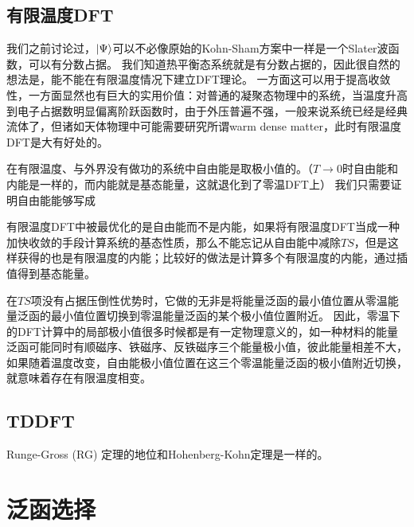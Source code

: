 \subsection{有限温度DFT}

我们之前讨论过，$\ket{\Psi}$可以不必像原始的Kohn-Sham方案中一样是一个Slater波函数，可以有分数占据。
我们知道热平衡态系统就是有分数占据的，因此很自然的想法是，能不能在有限温度情况下建立DFT理论。
一方面这可以用于提高收敛性，一方面显然也有巨大的实用价值：对普通的凝聚态物理中的系统，当温度升高到电子占据数明显偏离阶跃函数时，由于外压普遍不强，一般来说系统已经是经典流体了，但诸如天体物理中可能需要研究所谓warm dense matter，此时有限温度DFT是大有好处的。

在有限温度、与外界没有做功的系统中自由能是取极小值的。（$T \to 0$时自由能和内能是一样的，而内能就是基态能量，这就退化到了零温DFT上）
我们只需要证明自由能能够写成 \cite{mermin1965}

有限温度DFT中被最优化的是自由能而不是内能，如果将有限温度DFT当成一种加快收敛的手段计算系统的基态性质，那么不能忘记从自由能中减除$TS$，但是这样获得的也是有限温度的内能；比较好的做法是计算多个有限温度的内能，通过插值得到基态能量。

在$TS$项没有占据压倒性优势时，它做的无非是将能量泛函的最小值位置从零温能量泛函的最小值位置切换到零温能量泛函的某个极小值位置附近。
因此，零温下的DFT计算中的局部极小值很多时候都是有一定物理意义的，如一种材料的能量泛函可能同时有顺磁序、铁磁序、反铁磁序三个能量极小值，彼此能量相差不大，如果随着温度改变，自由能极小值位置在这三个零温能量泛函的极小值附近切换，就意味着存在有限温度相变。

\subsection{TDDFT}

Runge-Gross (RG) 定理的地位和Hohenberg-Kohn定理是一样的。

\section{泛函选择}

